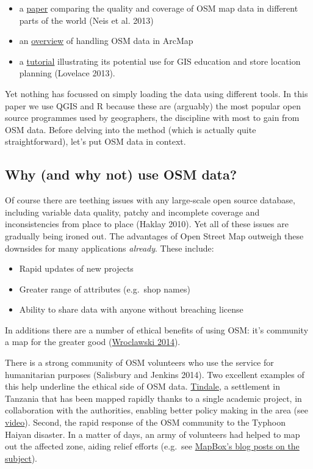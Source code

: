 \documentclass[]{article}
\begin{document}
\begin{itemize}
\item
  a \href{http://www.mdpi.com/1999-5903/5/2/282/pdf}{paper} comparing
  the quality and coverage of OSM map data in different parts of the
  world (Neis et al. 2013)
\item
  an
  \href{http://www.library.carleton.ca/sites/default/files/help/gis/WorkingWithOpenStreetMap.pdf}{overview}
  of handling OSM data in ArcMap
\item
  a
  \href{http://elogeo.nottingham.ac.uk/xmlui/bitstream/handle/url/289/osm-tutorial-final-2.pdf?sequence=1}{tutorial}
  illustrating its potential use for GIS education and store location
  planning (Lovelace 2013).
\end{itemize}
Yet nothing has focussed on simply loading the data using different
tools. In this paper we use QGIS and R because these are (arguably) the
most popular open source programmes used by geographers, the discipline
with most to gain from OSM data. Before delving into the method (which
is actually quite straightforward), let's put OSM data in context.

\subsection{Why (and why not) use OSM data?}

Of course there are teething issues with any large-scale open source
database, including variable data quality, patchy and incomplete
coverage and inconsistencies from place to place (Haklay 2010). Yet all
of these issues are gradually being ironed out. The advantages of Open
Street Map outweigh these downsides for many applications
\emph{already}. These include:

\begin{itemize}
\item
  Rapid updates of new projects
\item
  Greater range of attributes (e.g.~shop names)
\item
  Ability to share data with anyone without breaching license
\end{itemize}
In additions there are a number of ethical benefits of using OSM: it's
community a map for the greater good
(\href{http://www.theguardian.com/technology/2014/jan/14/why-the-world-needs-openstreetmap}{Wroclawski
2014}).

There is a strong community of OSM volunteers who use the service for
humanitarian purposes (Salisbury and Jenkins 2014). Two excellent
examples of this help underline the ethical side of OSM data.
\href{http://explore.ramanitanzania.org/}{Tindale}, a settlement in
Tanzania that has been mapped rapidly thanks to a single academic
project, in collaboration with the authorities, enabling better policy
making in the area (see
\href{http://www.youtube.com/watch?v=KqrGyvNnWkA}{video}). Second, the
rapid response of the OSM community to the Typhoon Haiyan disaster. In a
matter of days, an army of volunteers had helped to map out the affected
zone, aiding relief efforts (e.g.~see
\href{https://www.mapbox.com/blog/typhoon-haiyan-openstreetmap/}{MapBox's
blog posts on the subject}).
\end{document}
